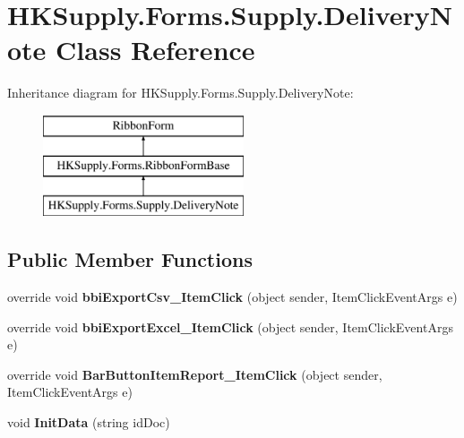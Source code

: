\hypertarget{class_h_k_supply_1_1_forms_1_1_supply_1_1_delivery_note}{}\section{H\+K\+Supply.\+Forms.\+Supply.\+Delivery\+Note Class Reference}
\label{class_h_k_supply_1_1_forms_1_1_supply_1_1_delivery_note}
Inheritance diagram for H\+K\+Supply.\+Forms.\+Supply.\+Delivery\+Note\+:\begin{figure}[H]
\begin{center}
\leavevmode
\includegraphics[height=3.000000cm]{class_h_k_supply_1_1_forms_1_1_supply_1_1_delivery_note}
\end{center}
\end{figure}
\subsection*{Public Member Functions}
\begin{DoxyCompactItemize}
\item 
\mbox{\label{class_h_k_supply_1_1_forms_1_1_supply_1_1_delivery_note_a42a07e4eb12fdc36e2ef02c85661b430}} 
override void {\bfseries bbi\+Export\+Csv\+\_\+\+Item\+Click} (object sender, Item\+Click\+Event\+Args e)
\item 
\mbox{\label{class_h_k_supply_1_1_forms_1_1_supply_1_1_delivery_note_a559016df87ee47caf064fefb47d09982}} 
override void {\bfseries bbi\+Export\+Excel\+\_\+\+Item\+Click} (object sender, Item\+Click\+Event\+Args e)
\item 
\mbox{\label{class_h_k_supply_1_1_forms_1_1_supply_1_1_delivery_note_ad2bc10d21deebf3e9308a3f69479f6a6}} 
override void {\bfseries Bar\+Button\+Item\+Report\+\_\+\+Item\+Click} (object sender, Item\+Click\+Event\+Args e)
\item 
\mbox{\label{class_h_k_supply_1_1_forms_1_1_supply_1_1_delivery_note_a0a68104bf025d1058e496c8a7f3c171a}} 
void {\bfseries Init\+Data} (string id\+Doc)
\end{DoxyCompactItemize}
